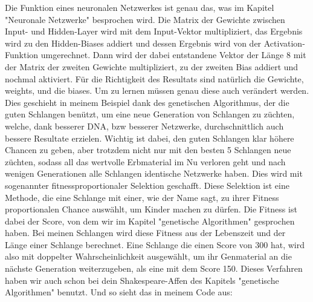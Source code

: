 \documentclass[11pt,a4paper,ngerman]{article}
\begin{document}
Die Funktion  eines neuronalen Netzwerkes ist genau das, was im Kapitel "Neuronale Netzwerke" besprochen wird. Die Matrix der Gewichte zwischen Input- und Hidden-Layer wird mit dem Input-Vektor multipliziert, das Ergebnis wird zu den Hidden-Biases addiert und dessen Ergebnis wird von der Activation-Funktion umgerechnet. Dann wird der dabei entstandene Vektor der Länge 8 mit der Matrix der zweiten Gewichte multipliziert, zu der zweiten Bias addiert und nochmal aktiviert. Für die Richtigkeit des Resultats sind natürlich die Gewichte, weights, und die biases. Um zu lernen müssen genau diese auch verändert werden. Dies geschieht in meinem Beispiel dank des genetischen Algorithmus, der die guten Schlangen benützt, um eine neue Generation von Schlangen zu züchten, welche, dank besserer DNA, bzw besserer Netzwerke, durchschnittlich auch bessere Resultate erzielen. Wichtig ist dabei, den guten Schlangen klar höhere Chancen zu geben, aber trotzdem nicht nur mit den besten 5 Schlangen neue züchten, sodass all das wertvolle Erbmaterial im Nu verloren geht und nach wenigen Generationen alle Schlangen identische Netzwerke haben. Dies wird mit sogenannter fitnessproportionaler Selektion geschafft. Diese Selektion ist eine Methode, die eine Schlange mit einer, wie der Name sagt, zu ihrer Fitness proportionalen Chance auswählt, um Kinder machen zu dürfen. Die Fitness ist dabei der Score, von dem wir im Kapitel "genetische Algorithmen" gesprochen haben. Bei meinen Schlangen wird diese Fitness aus der Lebenszeit und der Länge einer Schlange berechnet. Eine Schlange die einen Score von 300 hat, wird also mit doppelter Wahrscheinlichkeit ausgewählt, um ihr Genmaterial an die nächste Generation weiterzugeben, als eine mit dem Score 150. Dieses Verfahren haben wir auch schon bei dein Shakespeare-Affen des Kapitels "genetische Algorithmen" benutzt. Und so sieht 
das in meinem Code aus:
\end{document}
